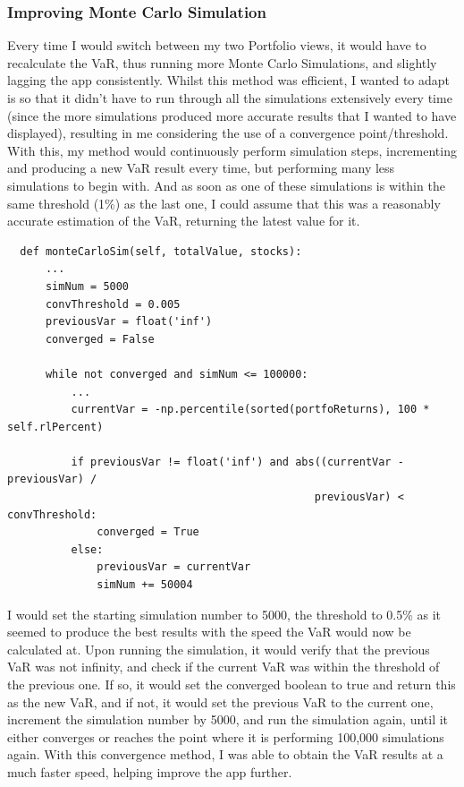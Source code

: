\documentclass{article}
\begin{document}
\subsubsection{Improving Monte Carlo Simulation}\label{improvingmcs}
Every time I would switch between my two Portfolio views, it would have to recalculate the VaR, thus running more Monte Carlo Simulations, and slightly lagging the app consistently. Whilst this method was efficient, I wanted to adapt is so that it didn't have to run through all the simulations extensively every time (since the more simulations produced more accurate results that I wanted to have displayed), resulting in me considering the use of a convergence point/threshold. With this, my method would continuously perform simulation steps, incrementing and producing a new VaR result every time, but performing many less simulations to begin with. And as soon as one of these simulations is within the same threshold (1\%) as the last one, I could assume that this was a reasonably accurate estimation of the VaR, returning the latest value for it.\\\vspace{0.3cm}

\begin{verbatim}
  def monteCarloSim(self, totalValue, stocks):
      ...
      simNum = 5000
      convThreshold = 0.005
      previousVar = float('inf')
      converged = False

      while not converged and simNum <= 100000:            
          ...
          currentVar = -np.percentile(sorted(portfoReturns), 100 * self.rlPercent)

          if previousVar != float('inf') and abs((currentVar - previousVar) / 
                                                previousVar) < convThreshold:
              converged = True
          else:
              previousVar = currentVar
              simNum += 50004
\end{verbatim}

\vspace{0.3cm}
I would set the starting simulation number to 5000, the threshold to 0.5\% as it seemed to produce the best results with the speed the VaR would now be calculated at. Upon running the simulation, it would verify that the previous VaR was not infinity, and check if the current VaR was within the threshold of the previous one. If so, it would set the converged boolean to true and return this as the new VaR, and if not, it would set the previous VaR to the current one, increment the simulation number by 5000, and run the simulation again, until it either converges or reaches the point where it is performing 100,000 simulations again. With this convergence method, I was able to obtain the VaR results at a much faster speed, helping improve the app further. \\\vspace{0.3cm}
\end{document}
